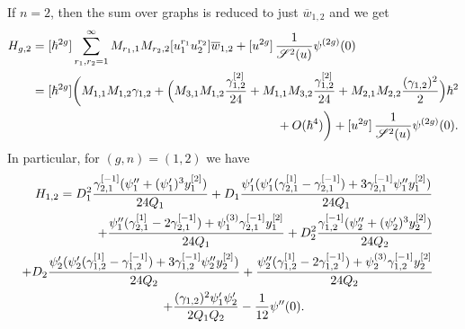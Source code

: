 \documentclass[JEP,XML,SOM,Unicode,NoEqCountersInSection,NoFloatCountersInSection]{cedram}
\let\mathcal\mathscr
\theoremstyle{plain}
\theoremstyle{definition}
\theoremstyle{remark}
\newcommand{\cS}{\mathcal{S}}
\begin{document}
If $n=2$, then the sum over graphs is reduced to just $\overline w_{1,2}$ and we get
\begin{align*}
H_{g,2}&= [\hbar^{2g}] \sum_{r_1,r_2=1}^\infty M_{r_1,1} M_{r_2,2}[u_1^{r_1}u_2^{r_2}]\overline w_{1,2}
+ [u^{2g}]\,\frac1{\cS^2(u)}\psi^{(2g)}(0)\\
&=
[\hbar^{2g}] \biggl(M_{1,1}M_{1,2}\gamma_{1,2}
+ \Bigl(M_{3,1}M_{1,2}\frac{\gamma_{1,2}^{[2]}}{24}
+M_{1,1}M_{3,2}\frac{\gamma_{1,2}^{[2]}}{24}+M_{2,1}M_{2,2}\frac{(\gamma_{1,2})^2}{2} \Bigr)\hbar^2
\\
&\hspace*{7cm}+O(\hbar^4)\biggr)
+ [u^{2g}]\,\frac1{\cS^2(u)}\psi^{(2g)}(0).
\end{align*}
In particular, for $(g,n)=(1,2)$ we have
\begin{multline*}
H_{1,2}=
D_1^2\frac{\gamma_{2,1}^{[-1]} (\psi_1''+(\psi_1')^3 y_1^{[2]})}{24Q_1}+
D_1\frac{\psi_1' (\psi_1' (\gamma_{2,1}^{[1]}-\gamma_{2,1}^{[-1]})+3 \gamma_{2,1}^{[-1]} \psi_1'' y_1^{[2]})}
{24Q_1}\\
\shoveright{+\frac{\psi_1''(\gamma_{2,1}^{[1]}-2 \gamma_{2,1}^{[-1]})+\psi_1^{(3)} \gamma_{2,1}^{[-1]} y_1^{[2]}}{24Q_1}
+D_2^2\frac{\gamma_{1,2}^{[-1]} (\psi_2''+(\psi_2')^3 y_2^{[2]})}{24Q_2}}\\
\shoveright{+D_2\frac{\psi_2' (\psi_2' (\gamma_{1,2}^{[1]}-\gamma_{1,2}^{[-1]})+3 \gamma_{1,2}^{[-1]} \psi_2'' y_2^{[2]})}
{24Q_2}+
\frac{\psi_2''(\gamma_{1,2}^{[1]}-2 \gamma_{1,2}^{[-1]})+\psi_2^{(3)} \gamma_{1,2}^{[-1]} y_2^{[2]}}{24Q_2}}
\\
+\frac{(\gamma_{1,2})^2 \psi_1' \psi_2'}{2Q_1Q_2}
-\frac{1}{12}\psi''(0).
\end{multline*}
\end{document}
